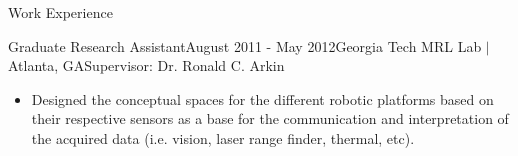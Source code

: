 \documentclass{resume} %
\begin{document}
\begin{rSection}{Work Experience}
\begin{rSubsection}{Graduate Research Assistant}{August 2011 - May 2012}{Georgia Tech MRL Lab $\vert$ Atlanta, GA}{Supervisor: Dr. Ronald C. Arkin}
\begin{itemize}
\item Designed the conceptual spaces for the different robotic platforms based
  on their respective sensors as a base for the communication and interpretation
  of the acquired data (i.e. vision, laser range finder, thermal, etc).

\end{itemize}

\end{rSubsection}
\fi


\end{rSection}





\end{document}

